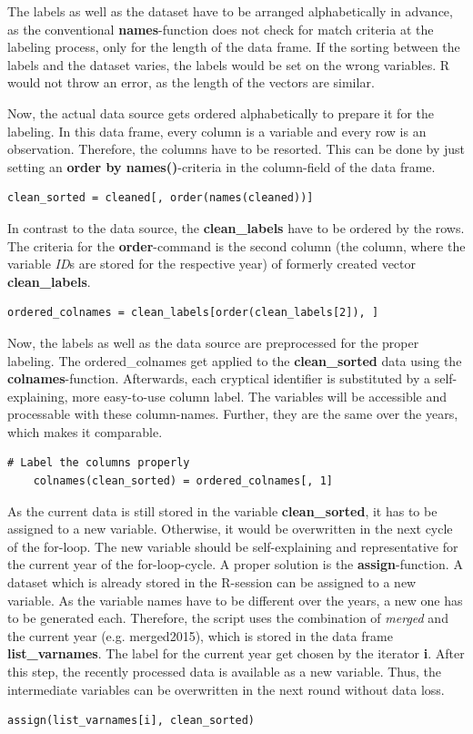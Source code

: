 \documentclass[a4paper]{article}
\begin{document}
The labels as well as the dataset have to be arranged alphabetically in advance, as the conventional \textbf{names}-function does not check for match criteria at the labeling process, only for the length of the data frame. If the sorting between the labels and the dataset varies, the labels would be set on the wrong variables. R would not throw an error, as the length of the vectors are similar.

Now, the actual data source gets ordered alphabetically to prepare it for the labeling. In this data frame, every column is a variable and every row is an observation. Therefore, the columns have to be resorted. This can be done by just setting an \textbf{order by names()}-criteria in the column-field of the data frame.
\begin{lstlisting}[firstnumber=53]
    clean_sorted = cleaned[, order(names(cleaned))]
\end{lstlisting}

In contrast to the data source, the \textbf{clean\_labels} have to be ordered by the rows. The criteria for the \textbf{order}-command is the second column (the column, where the variable \textit{ID}s are stored for the respective year) of formerly created vector \textbf{clean\_labels}.
\begin{lstlisting}[firstnumber=55]
    ordered_colnames = clean_labels[order(clean_labels[2]), ]
\end{lstlisting}

Now, the labels as well as the data source are preprocessed for the proper labeling. The ordered\_colnames get applied to the \textbf{clean\_sorted} data using the \textbf{colnames}-function. Afterwards, each cryptical identifier is substituted by a self-explaining, more easy-to-use column label. The variables will be accessible and processable with these column-names. Further, they are the same over the years, which makes it comparable.
\begin{lstlisting}[firstnumber=57]
    # Label the columns properly
    colnames(clean_sorted) = ordered_colnames[, 1]
\end{lstlisting}

As the current data is still stored in the variable \textbf{clean\_sorted}, it has to be assigned to a new variable. Otherwise, it would be overwritten in the next cycle of the for-loop. The new variable should be self-explaining and representative for the current year of the for-loop-cycle. A proper solution is the \textbf{assign}-function.  A dataset which is already stored in the R-session can be assigned to a new variable. As the variable names have to be different over the years, a new one has to be generated each. Therefore, the script uses the combination of \textit{merged} and the current year (e.g. merged2015), which is stored in the data frame \textbf{list\_varnames}. The label for the current year get chosen by the iterator \textbf{i}. After this step, the recently processed data is available as a new variable. Thus, the intermediate variables can be overwritten in the next round without data loss.
\begin{lstlisting}[firstnumber=59]
    assign(list_varnames[i], clean_sorted)
\end{lstlisting}
\end{document}
